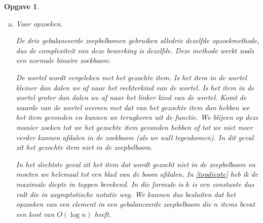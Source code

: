 \documentclass[12pt,hidelinks]{article}
\newtheorem{opgave}{Opgave}
\begin{document}
\begin{opgave}
\begin{enumerate}[a.]
            \item Voor opzoeken. 
                \label{opzoeken}

                \normalfont
                De drie gebalanceerde zeepbelbomen gebruiken alledrie dezelfde opzoekmethode, dus de complexiteit van deze bewerking is dezelfde.
                Deze methode werkt zoals een normale binaire zoekboom: 

                De wortel wordt vergeleken met het gezochte item. Is het item in de wortel kleiner dan dalen we af naar het rechterkind van de wortel. 
                Is het item in de wortel groter dan dalen we af naar het linker kind van de wortel.
                Komt de waarde van de wortel overeen met dat van het gezochte item dan hebben we het item gevonden en kunnen we terugkeren uit de functie.
                We blijven op deze manier zoeken tot we het gezochte item gevonden hebben of tot we niet meer verder kunnen afdalen in de zoekboom (als we null tegenkomen).
                In dit geval zit het gezochte item niet in de zeepbelboom.

                In het slechtste geval zit het item dat wordt gezocht niet in de zeepbelboom en moeten we helemaal tot een blad van de boom afdalen.
                In \eqref{topdiepte} heb ik de maximale diepte in toppen berekend.
                In die formule is $k$ is een constante dus valt die in asymptotische notatie weg.
                We kunnen dus besluiten dat het opzoeken van een element in een gebalanceerde zeepbelboom die $n$ items bevat een kost van $O(\log n)$ heeft.
        \end{enumerate}
    \end{opgave}
\end{document}
